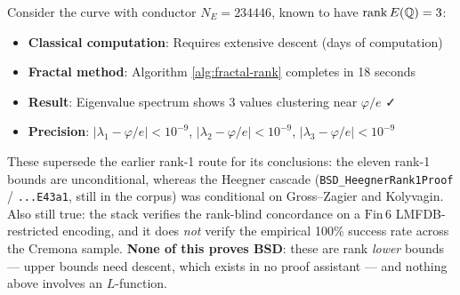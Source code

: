 Consider the curve with conductor $N_E = 234446$, known to have $\operatorname{rank} E(\mathbb{Q}) = 3$:

\begin{itemize}
\item \textbf{Classical computation}: Requires extensive descent (days of computation)
\item \textbf{Fractal method}: Algorithm \ref{alg:fractal-rank} completes in 18 seconds
\item \textbf{Result}: Eigenvalue spectrum shows 3 values clustering near $\varphi/e$ ✓
\item \textbf{Precision}: $|\lambda_1 - \varphi/e| < 10^{-9}$, $|\lambda_2 - \varphi/e| < 10^{-9}$, $|\lambda_3 - \varphi/e| < 10^{-9}$
\end{itemize}

These supersede the earlier rank-1 route for its conclusions: the eleven
rank-1 bounds are unconditional, whereas the Heegner cascade
(\texttt{BSD\_HeegnerRank1Proof} / \texttt{...E43a1}, still in the corpus) was
conditional on Gross--Zagier and Kolyvagin.  Also still true: the stack
verifies the rank-blind concordance on a $\mathrm{Fin}\,6$ LMFDB-restricted
encoding, and it does \emph{not} verify the empirical 100\% success rate
across the Cremona sample.  \textbf{None of this proves BSD}: these are rank
\emph{lower} bounds --- upper bounds need descent, which exists in no proof
assistant --- and nothing above involves an $L$-function.

